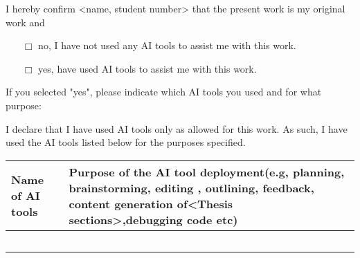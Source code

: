 \begin{center}
\vspace*{2cm}
{\Huge {}}
\vspace{1.5cm}
\end{center}

\label{sec: GenAI Declaration Template}
\noindent I hereby confirm <name, student number> that the present work is my original work and  
\begin{itemize}
    \item[$\Box$] no, I have not used any AI tools to assist me with this work.
     \item[$\Box$] yes, have used AI tools to assist me with this work.
\end{itemize}
\noindent If you selected "yes", please indicate which AI tools you used and for what purpose:

I declare that I have used AI tools only as allowed for this work. As such, I have used the AI tools listed below for the purposes specified.

\begin{table}[h]
\centering
\begin{tabular}{|p{}|p{}|}
\hline
\textbf{Name of AI tools} & \textbf{Purpose of the AI tool deployment(e.g, planning, brainstorming, editing , outlining, feedback, content generation of<Thesis sections>,debugging code etc)} \\
\hline
 &  \\
\hline
 &  \\
\hline
 &  \\
\hline
 &  \\
\hline
 &  \\
\hline
\end{tabular}
\end{table}
